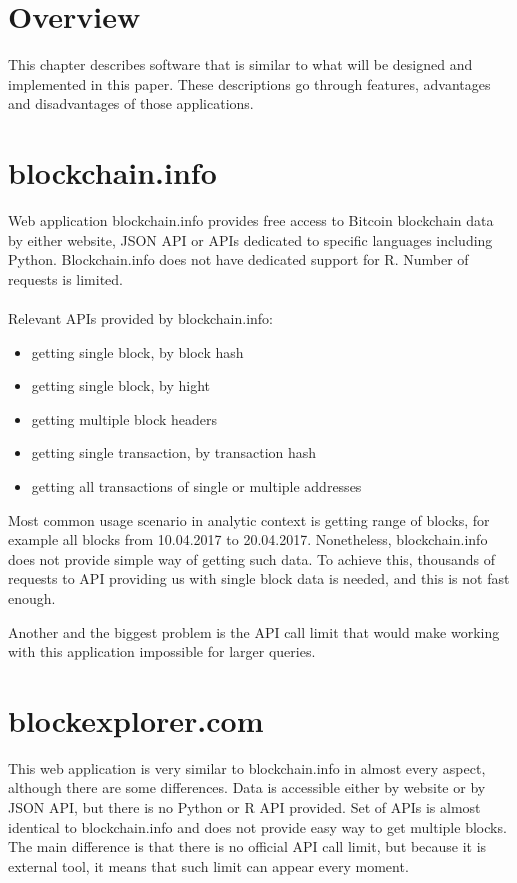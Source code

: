 \documentclass[12pt, en, eng, oneside, final]{mgr}
\begin{document}
\section{Overview}
This chapter describes software that is similar to what will be designed and implemented in this paper. These descriptions go through features, advantages and disadvantages of those applications. 

\section{blockchain.info}

Web application blockchain.info\cite{blokchain.info} provides free access to Bitcoin blockchain data by either website, JSON API or APIs dedicated to specific languages including Python. Blockchain.info does not have dedicated support for R. Number of requests is limited.
\\
\\
Relevant APIs provided by blockchain.info:
\begin{itemize}
\item
getting single block, by block hash
\item
getting single block, by hight
\item
getting multiple block headers
\item
getting single transaction, by transaction hash
\item
getting all transactions of single or multiple addresses


\end{itemize}

Most common usage scenario in analytic context is getting range of blocks, for example all blocks from 10.04.2017 to 20.04.2017. Nonetheless, blockchain.info does not provide simple way of getting such data. To achieve this, thousands of requests to API providing us with single block data is needed, and this is not fast enough.

Another and the biggest problem is the API call limit that would make working with this application impossible for larger queries.

\section{blockexplorer.com}

This web application\cite{blockexpolrer} is very similar to blockchain.info in almost every aspect, although there are some differences. Data is accessible either by website or by JSON API, but there is no Python or R API provided. Set of APIs is almost identical to blockchain.info and does not provide easy way to get multiple blocks. The main difference is that there is no official API call limit, but because it is external tool, it means that such limit can appear every moment.
\end{document}
